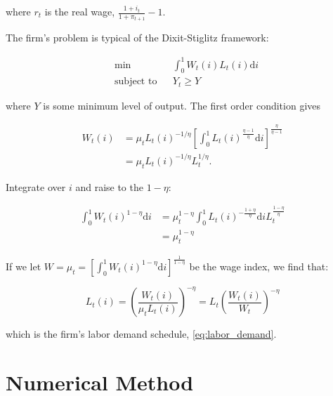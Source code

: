 \documentclass[12pt,a4paper]{scrartcl}            %
\begin{document}
where $r_t$ is the real wage, $\frac{1 + i_t}{1 + \pi_{t+1}} - 1$.

The firm's problem is typical of the Dixit-Stiglitz framework:

\begin{equation}
    \label{eqa:firms_problem}
    \begin{aligned}
        & \min
        & & \int_{0}^{1} \! W_t(i)L_t(i) \mathrm{d}i \\
        & \text{subject to}
        & & Y_t \geq Y
    \end{aligned}
\end{equation}

where $Y$ is some minimum level of output.  The first order condition gives

\begin{equation}
    \label{eqa:firms_foc}
    \begin{aligned}
        W_t(i) &= \mu_t L_t(i)^{-1 / \eta} \left[ \int_{0}^{1} \! L_t(i)^{\frac{\eta - 1}{\eta}} \mathrm{d}i \right]^{\frac{\eta}{\eta - 1}}\\
               &= \mu_t L_t(i)^{-1 / \eta} L_t^{1 / \eta}.
    \end{aligned}
\end{equation}

Integrate over $i$ and raise to the $1 - \eta$:

\begin{equation}
    \label{eqa:firms_foc2}
    \begin{aligned}
        \int_{0}^{1} \! W_t(i)^{1 - \eta} \mathrm{d}i &= \mu_t^{1 - \eta} \int_{0}^{1} \! L_t(i)^{-\frac{1 + \eta}{\eta}} \mathrm{d}i L_t^{\frac{1 - \eta}{\eta}}\\
                                                      &= \mu_t^{1 - \eta}
    \end{aligned}
\end{equation}

If we let $W = \mu_t = \left[ \int_{0}^{1} \! W_t(i)^{1 - \eta} \mathrm{d}i \right]^{\frac{1}{1 - \eta}}$ be the wage index, we find that:

\begin{equation}
    \label{eqa:firms_foc3}
    L_t(i) = \left(\frac{W_t(i)}{\mu_t L_t(i)}\right)^{-\eta} = L_t \left( \frac{W_t(i)}{W_t} \right)^{-\eta}
\end{equation}

which is the firm's labor demand schedule, \eqref{eq:labor_demand}.
\section{Numerical Method}
\label{sec:numerical_method}
\end{document}
